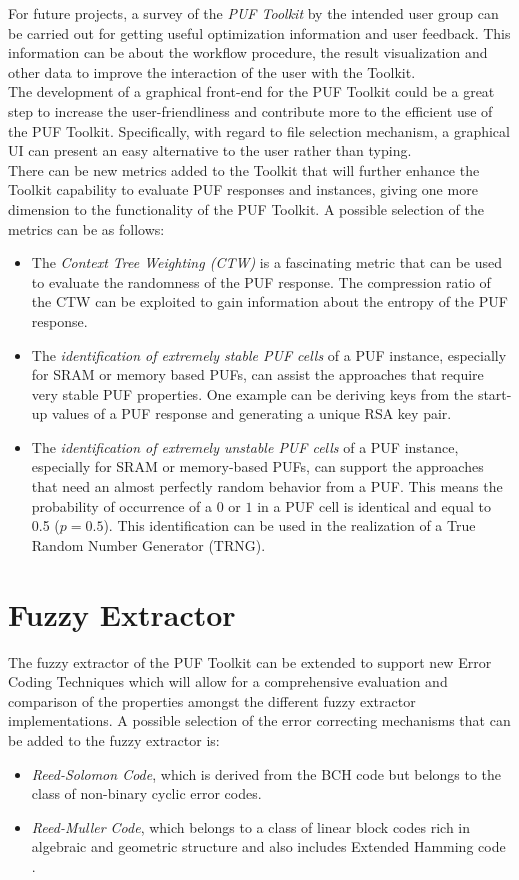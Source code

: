 For future projects, a survey of the \emph{PUF Toolkit} by the intended user group can be carried out for getting useful optimization information and user feedback. This information can be about the workflow procedure, the result visualization and other data to improve the interaction of the user with the Toolkit.\\

The development of a graphical front-end for the PUF Toolkit could be a great step to increase the user-friendliness and contribute more to the efficient use of the PUF Toolkit. Specifically, with regard to file selection mechanism, a graphical UI can present an easy alternative to the user rather than typing.\\

There can be new metrics added to the Toolkit that will further enhance the Toolkit capability to evaluate PUF responses and instances, giving one more dimension to the functionality of the PUF Toolkit. A possible selection of the metrics can be as follows:
\begin{itemize}
\item The \emph{Context Tree Weighting (CTW)} is a fascinating metric that can be used to evaluate the randomness of the PUF response. The compression ratio of the CTW can be exploited to gain information about the entropy of the PUF response.
\item The \emph{identification of extremely stable PUF cells} of a PUF instance, especially for SRAM or memory based PUFs, can assist the approaches that require very stable PUF properties. One example can be deriving keys from the start-up values of a PUF response and generating a unique RSA key pair.
\item The \emph{identification of extremely unstable PUF cells} of a PUF instance, especially for SRAM or memory-based PUFs, can support the approaches that need an almost perfectly random behavior from a PUF. This means the probability of occurrence of a $0$ or $1$ in a PUF cell is identical and equal to 0.5 ($p = 0.5$). This identification can be used in the realization of a True Random Number Generator (TRNG).
\end{itemize}

\section{Fuzzy Extractor}
The fuzzy extractor of the PUF Toolkit can be extended to support new Error Coding Techniques which will allow for a comprehensive evaluation and comparison of the properties amongst the different fuzzy extractor implementations. A possible selection of the error correcting mechanisms that can be added to the fuzzy extractor is:
\begin{itemize}
\item \emph{Reed-Solomon Code}, which is derived from the BCH code but belongs to the class of non-binary cyclic error codes.
\item \emph{Reed-Muller Code}, which belongs to a class of linear block codes rich in algebraic and geometric structure and also includes Extended Hamming code \cite{reed}.
\end{itemize}

